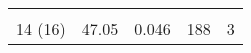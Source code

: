 \begin{table}[H]
{\begin{tabular}{|ccccc|}
\multicolumn{1}{|c|}{}                                                                                                                  & \multicolumn{1}{c|}{}                                                                                                                      & \multicolumn{1}{c|}{}                                                                                                                              & \multicolumn{1}{c|}{}                                                                                                                         &                                                      \\
\multicolumn{1}{|c|}{\multirow{-2}{*}{14 (16)}}                                                                                         & \multicolumn{1}{c|}{\multirow{-2}{*}{47.05}}                                                                                               & \multicolumn{1}{c|}{\multirow{-2}{*}{0.046}}                                                                                                       & \multicolumn{1}{c|}{\multirow{-2}{*}{188}}                                                                                                    & \multirow{-2}{*}{3}                                  \\ \hline
\end{tabular}}
\end{table}

